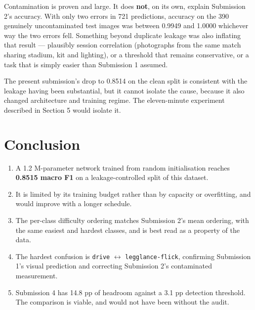 \documentclass[11pt,a4paper]{article}
\begin{document}
Contamination is proven and large. It does \textbf{not}, on its own, explain Submission
2's accuracy. With only two errors in 721 predictions, accuracy on the 390 genuinely
uncontaminated test images was between 0.9949 and 1.0000 whichever way the two errors
fell. Something beyond duplicate leakage was also inflating that result --- plausibly
session correlation (photographs from the same match sharing stadium, kit and lighting),
or a threshold that remains conservative, or a task that is simply easier than
Submission 1 assumed.

The present submission's drop to 0.8514 on the clean split is consistent with the
leakage having been substantial, but it cannot isolate the cause, because it also changed
architecture and training regime. The eleven-minute experiment described in Section 5
would isolate it.

\section{Conclusion}

\begin{enumerate}
\item A 1.2 M-parameter network trained from random initialisation reaches
  \textbf{0.8515 macro F1} on a leakage-controlled split of this dataset.
\item It is limited by its training budget rather than by capacity or overfitting, and
  would improve with a longer schedule.
\item The per-class difficulty ordering matches Submission 2's mean ordering, with the
  same easiest and hardest classes, and is best read as a property of the data.
\item The hardest confusion is \texttt{drive} $\leftrightarrow$
  \texttt{legglance-flick}, confirming Submission 1's visual prediction and correcting
  Submission 2's contaminated measurement.
\item Submission 4 has 14.8 pp of headroom against a 3.1 pp detection threshold. The
  comparison is viable, and would not have been without the audit.
\end{enumerate}
\end{document}
